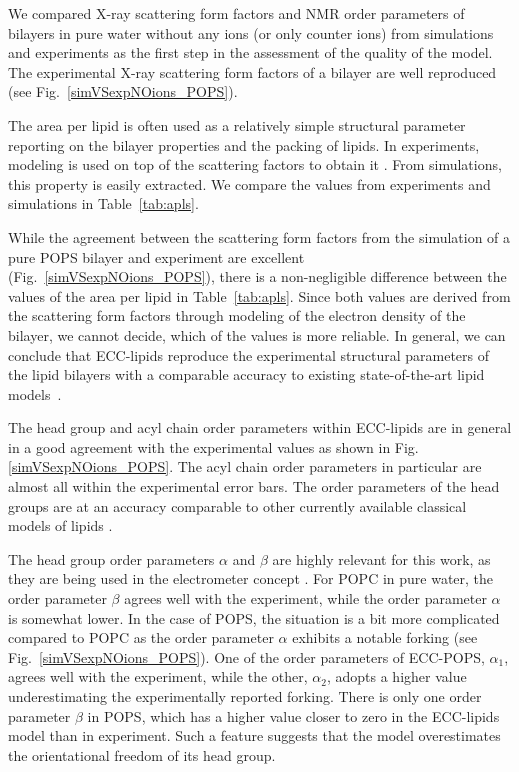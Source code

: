 \documentclass[journal=jpcbfk,manuscript=article]{achemso}
\begin{document}

We compared X-ray scattering form factors and NMR order parameters of bilayers
in pure water without any ions (or only counter ions)
from simulations and experiments
as the first step in the assessment of the quality of the model. 
The experimental X-ray scattering form factors 
of a bilayer are well reproduced  
(see Fig.~\ref{simVSexpNOions_POPS}). 

The area per lipid is often used as a relatively simple structural parameter reporting on the bilayer properties and the packing of lipids. 
In experiments, modeling is used on top of the scattering factors to obtain it \citep{kucerka14}. 
From simulations, this property is easily extracted. 
We compare the values from experiments and simulations in Table~\ref{tab:apls}. 


While the agreement between the scattering form factors 
from the simulation of a pure POPS bilayer and experiment 
are excellent (Fig.~\ref{simVSexpNOions_POPS}),
there is a non-negligible difference between the values of the area per lipid in Table~\ref{tab:apls}. 
Since both values are derived from the scattering form factors through modeling of the electron density of the bilayer,
we cannot decide, which of the values is more reliable. 
In general, we can conclude that ECC-lipids
reproduce the experimental structural parameters of the lipid bilayers 
with a comparable accuracy to existing state-of-the-art lipid models~\citep{botan15, ollila16, Pluhackova2016}. 
 
The head group and acyl chain order parameters within ECC-lipids
are in general in a good agreement with the experimental values 
as shown in Fig. \ref{simVSexpNOions_POPS}. 
The acyl chain order parameters in particular are almost all within the experimental error bars.
The order parameters of the head groups are at an accuracy comparable to 
other currently available classical models of lipids \citep{botan15, catte16, Pluhackova2016}. 

The head group order parameters $\alpha$ and $\beta$ are highly relevant for this work,
as they are being used in the electrometer concept \cite{altenbach84, catte16, melcr18}.
For POPC in pure water, the order parameter $\beta$ agrees well with the experiment, 
while the order parameter $\alpha$ is somewhat lower. 
In the case of POPS, the situation is a bit more complicated
compared to POPC as the order parameter $\alpha$ exhibits a notable forking (see Fig.~\ref{simVSexpNOions_POPS}).
One of the order parameters of ECC-POPS, $\alpha_1$, agrees well with the experiment, 
while the other, $\alpha_2$, adopts a higher value underestimating the experimentally reported forking. 
There is only one order parameter $\beta$ in POPS, 
which has a higher value closer to zero in the ECC-lipids model than in experiment. 
Such a feature suggests that the model overestimates the orientational freedom of its head group. 
\end{document}
